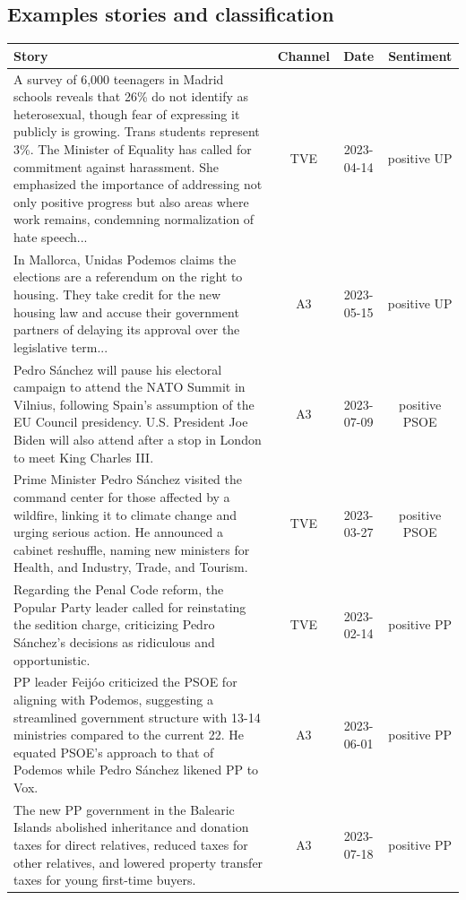 \documentclass[12pt]{article}
\begin{document}
	\clearpage
	
	
	\subsection{Examples stories and classification}
	
	
	\begin{longtable}{|p{8cm}|c|c|c|}
		\hline
		\textbf{Story} & \textbf{Channel} & \textbf{Date} & \textbf{Sentiment} \\
		\hline
		A survey of 6,000 teenagers in Madrid schools reveals that 26\% do not identify as heterosexual, though fear of expressing it publicly is growing. Trans students represent 3\%. The Minister of Equality has called for commitment against harassment. She emphasized the importance of addressing not only positive progress but also areas where work remains, condemning normalization of hate speech... & TVE & 2023-04-14 & positive UP \\
		\hline
		In Mallorca, Unidas Podemos claims the elections are a referendum on the right to housing. They take credit for the new housing law and accuse their government partners of delaying its approval over the legislative term... & A3 & 2023-05-15 & positive UP \\
		\hline
		Pedro S\'anchez will pause his electoral campaign to attend the NATO Summit in Vilnius, following Spain's assumption of the EU Council presidency. U.S. President Joe Biden will also attend after a stop in London to meet King Charles III. & A3 & 2023-07-09 & positive PSOE \\
		\hline
		Prime Minister Pedro S\'anchez visited the command center for those affected by a wildfire, linking it to climate change and urging serious action. He announced a cabinet reshuffle, naming new ministers for Health, and Industry, Trade, and Tourism. & TVE & 2023-03-27 & positive PSOE \\
		\hline
		Regarding the Penal Code reform, the Popular Party leader called for reinstating the sedition charge, criticizing Pedro S\'anchez's decisions as ridiculous and opportunistic. & TVE & 2023-02-14 & positive PP \\
		\hline
		PP leader Feij\'oo criticized the PSOE for aligning with Podemos, suggesting a streamlined government structure with 13-14 ministries compared to the current 22. He equated PSOE's approach to that of Podemos while Pedro S\'anchez likened PP to Vox. & A3 & 2023-06-01 & positive PP \\
		\hline
		The new PP government in the Balearic Islands abolished inheritance and donation taxes for direct relatives, reduced taxes for other relatives, and lowered property transfer taxes for young first-time buyers. & A3 & 2023-07-18 & positive PP \\

\end{longtable}
\end{document}
